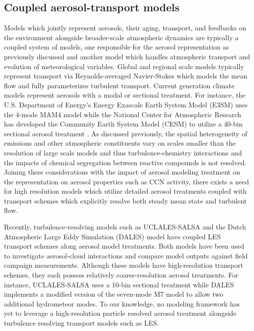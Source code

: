 \subsection{Coupled aerosol-transport models}
Models which jointly represent aerosols, their aging, transport, and feedbacks on the environment alongside broader-scale atmospheric dynamics are typically a coupled system of models, one responsible for the aerosol representation as previously discussed and another model which handles atmospheric transport and evolution of meteorological variables. Global and regional scale models typically represent transport via Reynolds-averaged Navier-Stokes which models the mean flow and fully parameterizes turbulent transport. Current generation climate models represent aerosols with a modal or sectional treatment. For instance, the U.S. Department of Energy's Energy Exascale Earth System Model (E3SM) uses the 4-mode MAM4 model \parencite{golaz_doe_2022} while the National Center for Atmospheric Research has developed the Community Earth System Model (CESM) to utilize a 40-bin sectional aerosol treatment \parencite{tilmes_description_2023}. As discussed previously, the spatial heterogeneity of emissions and other atmospheric constituents vary on scales smaller than the resolution of large scale models and thus turbulence-chemistry interactions and the impacts of chemical segregation between reactive compounds is not resolved. Joining these considerations with the impact of aerosol modeling treatment on the representation on aerosol properties such as CCN activity, there exists a need for high resolution models which utilize detailed aerosol treatments coupled with transport schemes which explicitly resolve both steady mean state and turbulent flow.

Recently, turbulence-resolving models such as UCLALES-SALSA \parencite{tonttila_uclalessalsa_2017} and the Dutch Atmospheric Large Eddy Simulation (DALES) model \parencite{de_bruine_explicit_2019} have coupled LES transport schemes along aerosol model treatments. Both models have been used to investigate aerosol-cloud interactions and compare model outputs against field campaign measurements. Although these models have high-resolution transport schemes, they each possess relatively coarse-resolution aerosol treatments. For instance, UCLALES-SALSA uses a 10-bin sectional treatment while DALES implements a modified version of the seven-mode M7 model to allow two additional hydrometeor modes. To our knowledge, no modeling framework has yet to leverage a high-resolution particle resolved aerosol treatment alongside turbulence resolving transport models such as LES. 

